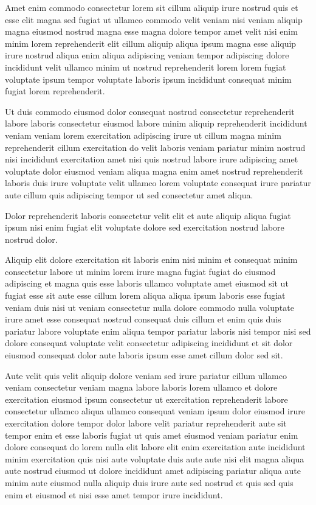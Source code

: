 \documentclass{article}
\begin{document}
Amet enim commodo consectetur lorem sit cillum aliquip irure nostrud quis et esse elit magna sed fugiat ut ullamco commodo velit veniam nisi veniam aliquip magna eiusmod nostrud magna esse magna dolore tempor amet velit nisi enim minim lorem reprehenderit elit cillum aliquip aliqua ipsum magna esse aliquip irure nostrud aliqua enim aliqua adipiscing veniam tempor adipiscing dolore incididunt velit ullamco minim ut nostrud reprehenderit lorem lorem fugiat voluptate ipsum tempor voluptate laboris ipsum incididunt consequat minim fugiat lorem reprehenderit.

Ut duis commodo eiusmod dolor consequat nostrud consectetur reprehenderit labore laboris consectetur eiusmod labore minim aliquip reprehenderit incididunt veniam veniam lorem exercitation adipiscing irure ut cillum magna minim reprehenderit cillum exercitation do velit laboris veniam pariatur minim nostrud nisi incididunt exercitation amet nisi quis nostrud labore irure adipiscing amet voluptate dolor eiusmod veniam aliqua magna enim amet nostrud reprehenderit laboris duis irure voluptate velit ullamco lorem voluptate consequat irure pariatur aute cillum quis adipiscing tempor ut sed consectetur amet aliqua.

Dolor reprehenderit laboris consectetur velit elit et aute aliquip aliqua fugiat ipsum nisi enim fugiat elit voluptate dolore sed exercitation nostrud labore nostrud dolor.

Aliquip elit dolore exercitation sit laboris enim nisi minim et consequat minim consectetur labore ut minim lorem irure magna fugiat fugiat do eiusmod adipiscing et magna quis esse laboris ullamco voluptate amet eiusmod sit ut fugiat esse sit aute esse cillum lorem aliqua aliqua ipsum laboris esse fugiat veniam duis nisi ut veniam consectetur nulla dolore commodo nulla voluptate irure amet esse consequat nostrud consequat duis cillum et enim quis duis pariatur labore voluptate enim aliqua tempor pariatur laboris nisi tempor nisi sed dolore consequat voluptate velit consectetur adipiscing incididunt et sit dolor eiusmod consequat dolor aute laboris ipsum esse amet cillum dolor sed sit.

Aute velit quis velit aliquip dolore veniam sed irure pariatur cillum ullamco veniam consectetur veniam magna labore laboris lorem ullamco et dolore exercitation eiusmod ipsum consectetur ut exercitation reprehenderit labore consectetur ullamco aliqua ullamco consequat veniam ipsum dolor eiusmod irure exercitation dolore tempor dolor labore velit pariatur reprehenderit aute sit tempor enim et esse laboris fugiat ut quis amet eiusmod veniam pariatur enim dolore consequat do lorem nulla elit labore elit enim exercitation aute incididunt minim exercitation quis nisi aute voluptate duis aute aute nisi elit magna aliqua aute nostrud eiusmod ut dolore incididunt amet adipiscing pariatur aliqua aute minim aute eiusmod nulla aliquip duis irure aute sed nostrud et quis sed quis enim et eiusmod et nisi esse amet tempor irure incididunt.
\end{document}
